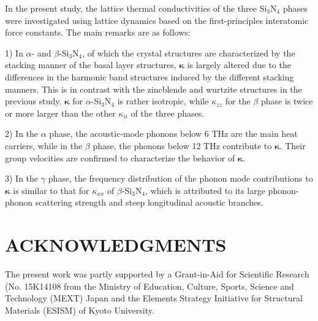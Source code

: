 \documentclass[twocolumn,amsmath,amssymb,a4paper,prb,superscriptaddress,floatfix]{revtex4-1}
\begin{document}
In the present study, the lattice thermal conductivities of the
three Si$_3$N$_4$ phases were investigated using lattice dynamics based on the
first-principles interatomic force constants. The main remarks are as follows:

1) In $\alpha$- and $\beta$-Si$_3$N$_4$, of which the crystal structures are
characterized by the stacking manner of the basal layer structures,
$\boldsymbol{\kappa}$ is largely altered due to the differences in the harmonic
band structures induced by the different stacking manners. This is in contrast
with the zincblende and wurtzite structures in the previous
study\cite{phono3py}. $\boldsymbol{\kappa}$ for $\alpha$-Si$_3$N$_4$ is rather
isotropic, while $\kappa$$_{zz}$ for the $\beta$ phase is twice or more larger
than the other $\kappa_{ii}$ of the three phases.

2) In the $\alpha$ phase, the acoustic-mode phonons below 6 THz are the main
heat carriers, while in the $\beta$ phase, the phonons below 12 THz contribute
to $\boldsymbol{\kappa}$. Their group velocities are confirmed to characterize
the behavior of $\boldsymbol{\kappa}$.

3) In the $\gamma$ phase, the frequency distribution of the phonon mode
contributions to $\boldsymbol{\kappa}$ is similar to that for $\kappa_{xx}$ of
$\beta$-Si$_3$N$_4$, which is attributed to its large phonon-phonon scattering
strength and steep longitudinal acoustic branches.



\section*{ACKNOWLEDGMENTS}
The present work was partly supported by a Grant-in-Aid for Scientific
Research (No. 15K14108 from the Ministry of Education, Culture, Sports, Science
and Technology (MEXT) Japan and the Elements Strategy Initiative for Structural
Materials (ESISM) of Kyoto University.

\appendix
\end{document}
